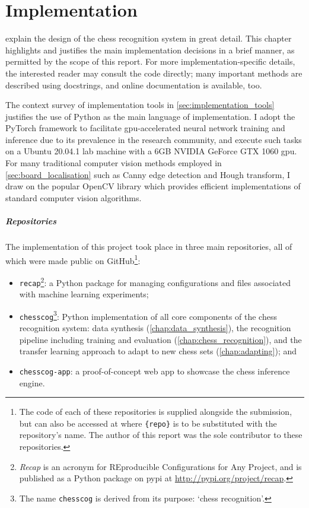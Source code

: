 \documentclass[../report.tex]{subfiles}
\begin{document}
\chapter{Implementation}
\label{chap:implementation}
 explain the design of the chess recognition system in great detail.
This chapter highlights and justifies the main implementation decisions in a brief manner, as permitted by the scope of this report.
For more implementation-specific details, the interested reader may consult the code directly; many important methods are described using docstrings, and online documentation is available, too.

The context survey of implementation tools in \cref{sec:implementation_tools} justifies the use of Python as the main language of implementation.
I adopt the PyTorch framework \cite{pytorch2019} to facilitate \acs{gpu}-accelerated neural network training and inference due to its prevalence in the research community, and execute such tasks on a Ubuntu 20.04.1 lab machine with a 6GB NVIDIA GeForce GTX 1060 \gls{gpu}.
For many traditional computer vision methods employed in \cref{sec:board_localisation} such as Canny edge detection and Hough transform, I draw on the popular OpenCV library \cite{opencv2000} which provides efficient implementations of standard computer vision algorithms.

\paragraph{Repositories}
The implementation of this project took place in three main repositories, all of which were made public on GitHub\footnote{The code of each of these repositories is supplied alongside the submission, but can also be accessed at  where \texttt{\{repo\}} is to be substituted with the repository's name. The author of this report was the sole contributor to these repositories.}:
\begin{itemize}
    \item \texttt{recap}\footnote{\emph{Recap} is an acronym for REproducible Configurations for Any Project, and is published as a Python package on \acs{pypi} at \url{http://pypi.org/project/recap}.}: a Python package for managing configurations and files associated with machine learning experiments;
    \item \texttt{chesscog}\footnote{The name \texttt{chesscog} is derived from its purpose: `chess recognition'.}: Python implementation of all core components of the chess recognition system: data synthesis (\cref{chap:data_synthesis}), the recognition pipeline including training and evaluation (\cref{chap:chess_recognition}), and the transfer learning approach to adapt to new chess sets (\cref{chap:adapting}); and
    \item \texttt{chesscog-app}: a proof-of-concept web app to showcase the chess inference engine.
\end{itemize}
\end{document}
